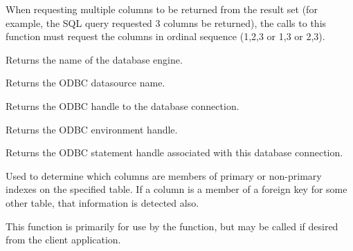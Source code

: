 
When requesting multiple columns to be returned from the result set (for example, the SQL query
requested 3 columns be returned), the calls to this function must request the columns in ordinal
sequence (1,2,3 or 1,3 or 2,3).

\label{wxdbgetdatabasename}


Returns the name of the database engine.

\label{wxdbgetdatasourcename}


Returns the ODBC datasource name.

\label{wxdbgethdbc}


Returns the ODBC handle to the database connection.

\label{wxdbgethenv}


Returns the ODBC environment handle.

\label{wxdbgethstmt}


Returns the ODBC statement handle associated with this database connection.

\label{wxdbgetkeyfields}


Used to determine which columns are members of primary or non-primary indexes on the specified table.  If a column is a member of a foreign key for some other table, that information is detected also.

This function is primarily for use by the  function, but may be called if desired from the client application.



